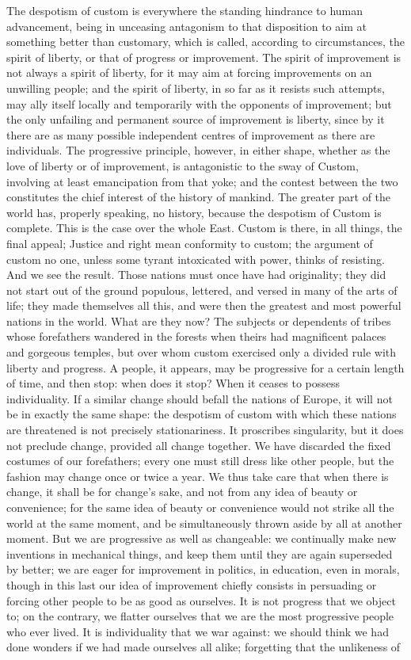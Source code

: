 \documentclass[12pt]{report}
\begin{document}
The despotism of custom is everywhere the standing hindrance to human advancement, being in unceasing antagonism to that disposition to aim at something better than customary, which is called, according to circumstances, the spirit of liberty, or that of progress or improvement. The spirit of improvement is not always a spirit of liberty, for it may aim at forcing improvements on an unwilling people; and the spirit of liberty, in so far as it resists such attempts, may ally itself locally and temporarily with the opponents of improvement; but the only unfailing and permanent source of improvement is liberty, since by it there are as many possible independent centres of improvement as there are individuals. The progressive principle, however, in either shape, whether as the love of liberty or of improvement, is antagonistic to the sway of Custom, involving at least emancipation from that yoke; and the contest between the two constitutes the chief interest of the history of mankind. The greater part of the world has, properly speaking, no history, because the despotism of Custom is complete. This is the case over the whole East. Custom is there, in all things, the final appeal; Justice and right mean conformity to custom; the argument of custom no one, unless some tyrant intoxicated with power, thinks of resisting. And we see the result. Those nations must once have had originality; they did not start out of the ground populous, lettered, and versed in many of the arts of life; they made themselves all this, and were then the greatest and most powerful nations in the world. What are they now? The subjects or dependents of tribes whose forefathers wandered in the forests when theirs had magnificent palaces and gorgeous temples, but over whom custom exercised only a divided rule with liberty and progress. A people, it appears, may be progressive for a certain length of time, and then stop: when does it stop? When it ceases to possess individuality. If a similar change should befall the nations of Europe, it will not be in exactly the same shape: the despotism of custom with which these nations are threatened is not precisely stationariness. It proscribes singularity, but it does not preclude change, provided all change together. We have discarded the fixed costumes of our forefathers; every one must still dress like other people, but the fashion may change once or twice a year. We thus take care that when there is change, it shall be for change's sake, and not from any idea of beauty or convenience; for the same idea of beauty or convenience would not strike all the world at the same moment, and be simultaneously thrown aside by all at another moment. But we are progressive as well as changeable: we continually make new inventions in mechanical things, and keep them until they are again superseded by better; we are eager for improvement in politics, in education, even in morals, though in this last our idea of improvement chiefly consists in persuading or forcing other people to be as good as ourselves. It is not progress that we object to; on the contrary, we flatter ourselves that we are the most progressive people who ever lived. It is individuality that we war against: we should think we had done wonders if we had made ourselves all alike; forgetting that the unlikeness of 
\end{document}
